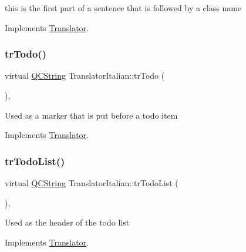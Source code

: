 this is the first part of a sentence that is followed by a class name 

Implements \mbox{\hyperlink{class_translator}{Translator}}.

\mbox{\label{class_translator_italian_a70ea38bdc0c5c8bde19a250e3cd9323d}} 
\subsubsection{\texorpdfstring{trTodo()}{trTodo()}}
{\footnotesize\ttfamily virtual \mbox{\hyperlink{class_q_c_string}{Q\+C\+String}} Translator\+Italian\+::tr\+Todo (\begin{DoxyParamCaption}{ }\end{DoxyParamCaption})\hspace{0.3cm}{\ttfamily [inline]}, {\ttfamily [virtual]}}

Used as a marker that is put before a todo item 

Implements \mbox{\hyperlink{class_translator}{Translator}}.

\mbox{\label{class_translator_italian_a189dd144e0ad5e159dec8798e6b96a85}} 
\subsubsection{\texorpdfstring{trTodoList()}{trTodoList()}}
{\footnotesize\ttfamily virtual \mbox{\hyperlink{class_q_c_string}{Q\+C\+String}} Translator\+Italian\+::tr\+Todo\+List (\begin{DoxyParamCaption}{ }\end{DoxyParamCaption})\hspace{0.3cm}{\ttfamily [inline]}, {\ttfamily [virtual]}}

Used as the header of the todo list 

Implements \mbox{\hyperlink{class_translator}{Translator}}.

\mbox{\label{class_translator_italian_ab1598d928fcf4981cf664b9b13c5b1dd}} 

